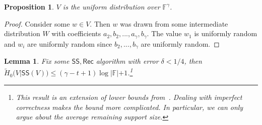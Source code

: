 \documentclass[11pt]{article}
\newcommand{\class}[1]{{\ensuremath{\mathsf{#1}}}}
\newcommand{\sketch}{\ensuremath{\class{SS}}\xspace}
\newcommand{\rec}{\ensuremath{\class{Rec}}\xspace}
\newtheorem{lemma}[theorem]{Lemma}
\newtheorem{proposition}[theorem]{Proposition}
\begin{document}
\begin{proposition}
\label{prop:distribution uniform} $V$ is the uniform distribution over $\mathbb{F}^\gamma$.
\end{proposition}
\begin{proof}
Consider some $w\in V$.  Then $w$ was drawn from some intermediate distribution $W$ with coefficients $a_2, b_2, ..., a_\gamma , b_\gamma$.  The value $w_1$ is uniformly random and $w_i$ are uniformly random since $b_2,..., b_\gamma$ are uniformly random.
\end{proof}
\begin{lemma}
\label{lem:secure sketch entropy loss}
Fix some $\sketch, \rec$ algorithm with error $\delta < 1/4$, then $\tilde{H}_0(V | \sketch(V)) \le (\gamma-t+1)\log |\mathbb{F}|+1$.\footnote{This result is an extension of lower bounds from~\cite[Appendix C]{DBLP:journals/siamcomp/DodisORS08}.  Dealing with imperfect correctness makes the bound more complicated.  In particular, we can only argue about the average remaining support size.}
\end{lemma}
\end{document}
